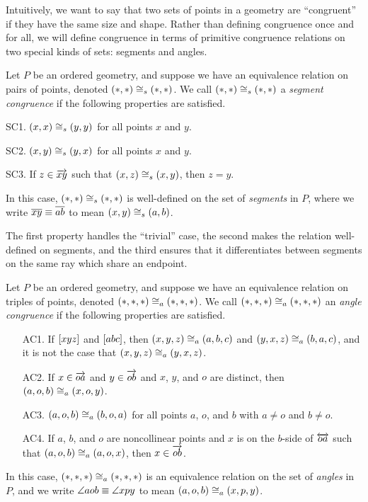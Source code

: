 Intuitively, we want to say that two sets of points in a geometry are ``congruent'' if they have the same size and shape. Rather than defining congruence once and for all, we will define congruence in terms of primitive congruence relations on two special kinds of sets: segments and angles.

\begin{dfn}
Let \(P\) be an ordered geometry, and suppose we have an equivalence relation on pairs of points, denoted \((\ast,\ast) \cong_s (\ast,\ast)\). We call \((\ast,\ast) \cong_s (\ast,\ast)\) a \emph{segment congruence} if the following properties are satisfied.
\begin{proplist}
\item[SC1.] \((x,x) \cong_s (y,y)\) for all points \(x\) and \(y\).
\item[SC2.] \((x,y) \cong_s (y,x)\) for all points \(x\) and \(y\).
\item[SC3.] If \(z \in \overrightarrow{xy}\) such that \((x,z) \cong_s (x,y)\), then \(z = y\).
\end{proplist}
In this case, \((\ast,\ast) \cong_s (\ast,\ast)\) is well-defined on the set of \emph{segments} in \(P\), where we write \(\overline{xy} \equiv \overline{ab}\) to mean \((x,y) \cong_s (a,b)\).
\end{dfn}

The first property handles the ``trivial'' case, the second makes the relation well-defined on segments, and the third ensures that it differentiates between segments on the same ray which share an endpoint.

\begin{dfn}
Let \(P\) be an ordered geometry, and suppose we have an equivalence relation on triples of points, denoted \((\ast,\ast,\ast) \cong_a (\ast,\ast,\ast)\). We call \((\ast,\ast,\ast) \cong_a (\ast,\ast,\ast)\) an \emph{angle congruence} if the following properties are satisfied.
\begin{itemize}
\item[AC1.] If \([ x y z ]\) and \([ a b c ]\), then \((x,y,z) \cong_a (a,b,c)\) and \((y,x,z) \cong_a (b,a,c)\), and it is not the case that \((x,y,z) \cong_a (y,x,z)\).
\item[AC2.] If \(x \in \overrightarrow{oa}\) and \(y \in \overrightarrow{ob}\) and \(x\), \(y\), and \(o\) are distinct, then \((a,o,b) \cong_a (x,o,y)\).
\item[AC3.] \((a,o,b) \cong_a (b,o,a)\) for all points \(a\), \(o\), and \(b\) with \(a \neq o\) and \(b \neq o\).
\item[AC4.] If \(a\), \(b\), and \(o\) are noncollinear points and \(x\) is on the \(b\)-side of \(\overleftrightarrow{oa}\) such that \((a,o,b) \cong_a (a,o,x)\), then \(x \in \overrightarrow{ob}\).
\end{itemize}
In this case, \((\ast,\ast,\ast) \cong_a (\ast,\ast,\ast)\) is an equivalence relation on the set of \emph{angles} in \(P\), and we write \(\angle{aob} \equiv \angle{xpy}\) to mean \((a,o,b) \cong_a (x,p,y)\).
\end{dfn}


